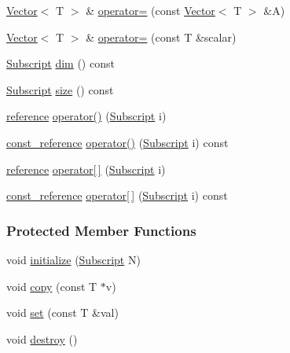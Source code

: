 \begin{DoxyCompactItemize}
\item 
\hyperlink{class_t_n_t_1_1_vector}{Vector}$<$ T $>$ \& \hyperlink{class_t_n_t_1_1_vector_ad381a0e422ce8e5a46cc374ee07a8556}{operator=} (const \hyperlink{class_t_n_t_1_1_vector}{Vector}$<$ T $>$ \&A)
\item 
\hyperlink{class_t_n_t_1_1_vector}{Vector}$<$ T $>$ \& \hyperlink{class_t_n_t_1_1_vector_ab4cf6d14d44d75f6b82fcb9178920e11}{operator=} (const T \&scalar)
\item 
\hyperlink{namespace_t_n_t_af22e3f1460e145c04ce4e7d701e4c1c1}{Subscript} \hyperlink{class_t_n_t_1_1_vector_afa8371d110c5723532594b8a8ae3c1db}{dim} () const 
\item 
\hyperlink{namespace_t_n_t_af22e3f1460e145c04ce4e7d701e4c1c1}{Subscript} \hyperlink{class_t_n_t_1_1_vector_a222e873d0962fed4c415aeaf18d8431f}{size} () const 
\item 
\hyperlink{class_t_n_t_1_1_vector_a9cdf62749080406bdf3fbace264dac85}{reference} \hyperlink{class_t_n_t_1_1_vector_a3c64911f1a80247c6a973f68d7196038}{operator()} (\hyperlink{namespace_t_n_t_af22e3f1460e145c04ce4e7d701e4c1c1}{Subscript} i)
\item 
\hyperlink{class_t_n_t_1_1_vector_a2957faed9560f1f53bc5943a160d71bf}{const\_\-reference} \hyperlink{class_t_n_t_1_1_vector_acca924ac82897e75fec31e58a163acf2}{operator()} (\hyperlink{namespace_t_n_t_af22e3f1460e145c04ce4e7d701e4c1c1}{Subscript} i) const 
\item 
\hyperlink{class_t_n_t_1_1_vector_a9cdf62749080406bdf3fbace264dac85}{reference} \hyperlink{class_t_n_t_1_1_vector_ac7fc76b0f4937e37d75f9900fec9c6e1}{operator\mbox{[}$\,$\mbox{]}} (\hyperlink{namespace_t_n_t_af22e3f1460e145c04ce4e7d701e4c1c1}{Subscript} i)
\item 
\hyperlink{class_t_n_t_1_1_vector_a2957faed9560f1f53bc5943a160d71bf}{const\_\-reference} \hyperlink{class_t_n_t_1_1_vector_af11d7d23ebf69b435ed1e7fb45118eb8}{operator\mbox{[}$\,$\mbox{]}} (\hyperlink{namespace_t_n_t_af22e3f1460e145c04ce4e7d701e4c1c1}{Subscript} i) const 
\end{DoxyCompactItemize}
\subsubsection*{Protected Member Functions}
\begin{DoxyCompactItemize}
\item 
void \hyperlink{class_t_n_t_1_1_vector_a4f475be0e3634f05a058e5c10b665c62}{initialize} (\hyperlink{namespace_t_n_t_af22e3f1460e145c04ce4e7d701e4c1c1}{Subscript} N)
\item 
void \hyperlink{class_t_n_t_1_1_vector_a85902585fa9de818133ead8a89b194ac}{copy} (const T $\ast$v)
\item 
void \hyperlink{class_t_n_t_1_1_vector_a6e6f148d1889821389e560ce4a213ac8}{set} (const T \&val)
\item 
void \hyperlink{class_t_n_t_1_1_vector_afb46bf5892eb43cbd0b8cc8f7a126710}{destroy} ()
\end{DoxyCompactItemize}
